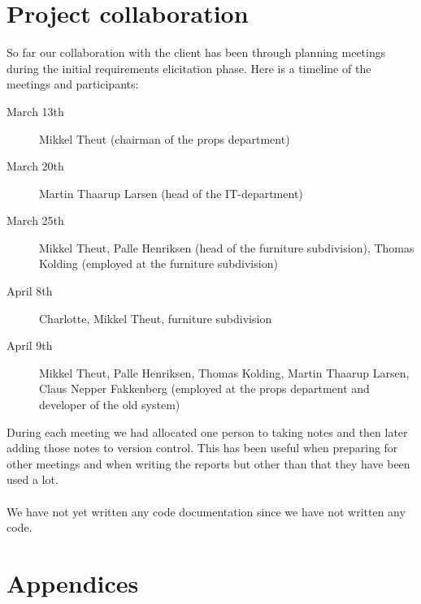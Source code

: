\documentclass[12pt]{article}
\begin{document}
\section{Project collaboration}
So far our collaboration with the client has been through planning meetings during the initial requirements elicitation phase. Here is a timeline of the meetings and participants:
\begin{description}
\item[March 13th]
  Mikkel Theut (chairman of the props department)
\item[March 20th]
  Martin Thaarup Larsen (head of the IT-department)
\item[March 25th]
  Mikkel Theut, Palle Henriksen (head of the furniture subdivision), Thomas Kolding (employed at the furniture subdivision)
\item[April 8th]
  Charlotte, Mikkel Theut, furniture subdivision
\item[April 9th]
  Mikkel Theut, Palle Henriksen, Thomas Kolding, Martin Thaarup Larsen, Claus Nepper Fakkenberg (employed at the props department and developer of the old system)
\end{description}
During each meeting we had allocated one person to taking notes and then later adding those notes to version control. This has been useful when preparing for other meetings and when writing the reports but other than that they have been used a lot.\\\\
We have not yet written any code documentation since we have not written any code.
\section{Appendices}
\end{document}
